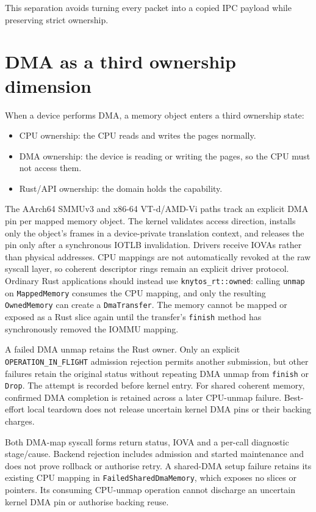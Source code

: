 This separation avoids turning every packet into a copied IPC payload while
preserving strict ownership.

\section{DMA as a third ownership dimension}

When a device performs DMA, a memory object enters a third ownership state:

\begin{itemize}
    \item CPU ownership: the CPU reads and writes the pages normally.
    \item DMA ownership: the device is reading or writing the pages, so the
        CPU must not access them.
    \item Rust/API ownership: the domain holds the capability.
\end{itemize}

The AArch64 SMMUv3 and x86-64 VT-d/AMD-Vi paths track an explicit DMA pin per
mapped memory object. The kernel validates access direction, installs only the
object's frames in a device-private translation context, and releases the pin
only after a synchronous IOTLB invalidation. Drivers receive IOVAs rather than
physical addresses. CPU mappings are not automatically revoked at the raw
syscall layer, so coherent descriptor rings remain an explicit driver protocol.
Ordinary Rust applications should instead use \texttt{knytos\_rt::owned}:
calling \texttt{unmap} on \texttt{MappedMemory} consumes the CPU mapping, and
only the resulting \texttt{OwnedMemory} can create a \texttt{DmaTransfer}.
The memory cannot be mapped or exposed as a Rust slice again until the
transfer's \texttt{finish} method has synchronously removed the IOMMU mapping.

A failed DMA unmap retains the Rust owner. Only an explicit
\texttt{OPERATION\_IN\_FLIGHT} admission rejection permits another submission, but
other failures retain the original status without repeating DMA unmap from
\texttt{finish} or \texttt{Drop}. The attempt is recorded before kernel entry.
For shared coherent memory, confirmed DMA completion is retained across a later
CPU-unmap failure. Best-effort local teardown does not release uncertain kernel
DMA pins or their backing charges.

Both DMA-map syscall forms return status, IOVA and a per-call diagnostic
stage/cause. Backend rejection includes admission and started maintenance
and does not prove rollback or authorise retry. A shared-DMA setup failure
retains its existing CPU mapping in \texttt{FailedSharedDmaMemory}, which exposes
no slices or pointers. Its consuming CPU-unmap operation cannot discharge an
uncertain kernel DMA pin or authorise backing reuse.



